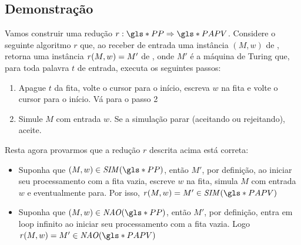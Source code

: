 \documentclass[../main.tex]{subfiles}
\begin{document}
\subsection{Demonstração}

Vamos construir uma redução $r : \PP\Rightarrow\PAPV$. Considere o seguinte algoritmo $r$ que, ao receber de entrada uma instância $(M, w)$ de \PP, retorna uma instância $\mathit{r}(M, w) = M'$ de \PAPV, onde $M'$ é a máquina de Turing que, para toda palavra $t$ de entrada, executa os seguintes passos:

\begin{enumerate}
    \item Apague $t$ da fita, volte o cursor para o início, escreva $w$ na fita e volte o cursor para o início. Vá para o passo 2
    \item Simule $M$ com entrada $w$. Se a simulação parar (aceitando ou rejeitando), aceite.
\end{enumerate}

Resta agora provarmos que a redução $r$ descrita acima está correta:

\begin{itemize}
    \item Suponha que $(M,w) \in \SIM{\PP}$, então $M'$, por definição, ao iniciar seu processamento com a fita vazia, escreve $w$ na fita, simula $M$ com entrada $w$ e eventualmente para. Por isso, $\func{r}{M,w} = M' \in \SIM{\PAPV}$
    \item Suponha que $(M,w) \in \NAO{\PP}$, então $M'$, por definição, entra em loop infinito ao iniciar seu processamento com a fita vazia. Logo $\func{r}{M,w}=M'\in\NAO{\PAPV}$
\end{itemize}
\end{document}
